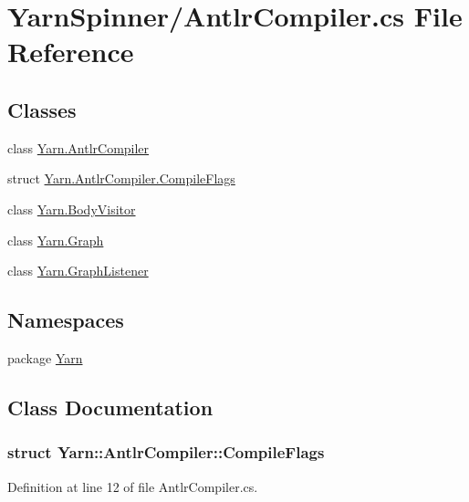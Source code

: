 \hypertarget{a00288}{\section{Yarn\-Spinner/\-Antlr\-Compiler.cs File Reference}
\label{a00288}
}
\subsection*{Classes}
\begin{DoxyCompactItemize}
\item 
class \hyperlink{a00028}{Yarn.\-Antlr\-Compiler}
\item 
struct \hyperlink{a00028_a00356}{Yarn.\-Antlr\-Compiler.\-Compile\-Flags}
\item 
class \hyperlink{a00034}{Yarn.\-Body\-Visitor}
\item 
class \hyperlink{a00098}{Yarn.\-Graph}
\item 
class \hyperlink{a00099}{Yarn.\-Graph\-Listener}
\end{DoxyCompactItemize}
\subsection*{Namespaces}
\begin{DoxyCompactItemize}
\item 
package \hyperlink{a00041}{Yarn}
\end{DoxyCompactItemize}


\subsection{Class Documentation}
\label{a00356}
\hypertarget{a00028_a00356}{}
\subsubsection{struct Yarn\-:\-:Antlr\-Compiler\-:\-:Compile\-Flags}


Definition at line 12 of file Antlr\-Compiler.\-cs.



